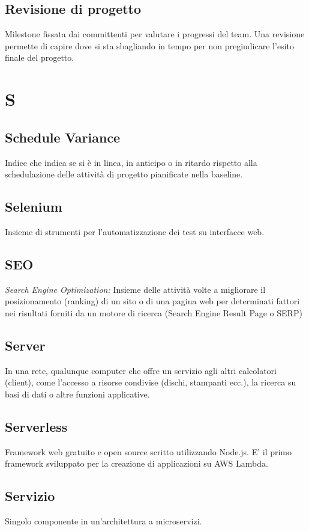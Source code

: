 \subsection*{Revisione di progetto}
Milestone fissata dai committenti per valutare i progressi del team. Una revisione permette di capire dove si sta sbagliando in tempo per non pregiudicare l'esito finale del progetto.

\newpage
\section{S}
\subsection*{Schedule Variance}
Indice che indica se si è in linea, in anticipo o in ritardo rispetto alla schedulazione delle attività di progetto pianificate nella baseline.

\subsection*{Selenium}
Insieme di strumenti per l'automatizzazione dei test su interfacce web.

\subsection*{SEO}
\textit{Search Engine Optimization:} Insieme delle attività volte a migliorare il posizionamento (ranking) di un sito o di una pagina web per determinati fattori nei risultati forniti
da un motore di ricerca (Search Engine Result Page o SERP)

\subsection*{Server}
In una rete, qualunque computer che offre un servizio agli altri calcolatori (client), come l'accesso a risorse condivise (dischi, stampanti ecc.), la ricerca su basi di dati o altre funzioni applicative.

\subsection*{Serverless}
Framework web gratuito e open source scritto utilizzando Node.js. E' il primo framework sviluppato per la creazione di applicazioni su AWS Lambda.

\subsection*{Servizio}
Singolo componente in un'architettura a microservizi.


